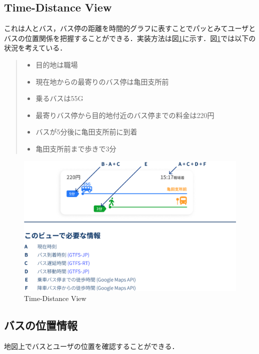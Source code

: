 \subsection{Time-Distance View}
これは人とバス，バス停の距離を時間的グラフに表すことでパッとみてユーザとバスの位置関係を把握することができる．実装方法は図\ref{fig:feature_timedistanceview}に示す．図\ref{fig:feature_timedistanceview}では以下の状況を考えている．

\begin{quote}
    \begin{itemize}
        \item 目的地は職場
        \item 現在地からの最寄りのバス停は亀田支所前
        \item 乗るバスは55G
        \item 最寄りバス停から目的地付近のバス停までの料金は220円
        \item バスが5分後に亀田支所前に到着
        \item 亀田支所前まで歩きで3分
    \end{itemize}
\end{quote}

\begin{figure}[htbp]
    \centering
    \includegraphics[width=12cm]{images/feature_timedistanceview.png}
    \caption{Time-Distance View}
    \label{fig:feature_timedistanceview}
\end{figure}
\pagebreak
\subsection{バスの位置情報}
地図上でバスとユーザの位置を確認することができる．

